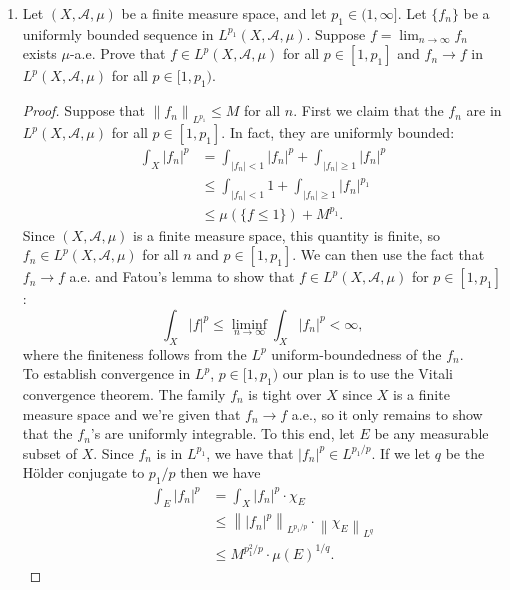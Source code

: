 \documentclass[11pt,letterpaper]{report}
\newcommand{\mcal}[1]{\mathcal{#1}}
\newcommand{\Lp}[2]{\left\|{#1}\right\|_{L^{#2}}}
\begin{document}
\begin{enumerate}
	\item Let $(X, \mcal{A}, \mu)$ be a finite measure space, and let $p_1\in (1, \infty]$. Let $\{f_n\}$ be a uniformly bounded sequence in $L^{p_1}(X, \mcal{A}, \mu)$. Suppose $f = \lim_{n\to \infty}f_n$ exists $\mu$-a.e. Prove that $f\in L^p(X, \mcal{A}, \mu)$ for all $p\in [1, p_1]$ and $f_n\to f$ in $L^p(X, \mcal{A}, \mu)$ for all $p\in [1, p_1)$.
	\begin{proof}
		Suppose that $\Lp{f_n}{p_1}\leq M$ for all $n$. First we claim that the $f_n$ are in $L^p(X, \mcal{A}, \mu)$ for all $p\in [1, p_1]$. In fact, they are uniformly bounded:
		\begin{equation}\label{s16_4_main}
		\begin{split}
			\int_X|f_n|^p &= \int_{|f_n|<1}|f_n|^p + \int_{|f_n|\geq 1}|f_n|^p\\
			&\leq \int_{|f_n|<1}1 + \int_{|f_n|\geq 1}|f_n|^{p_1}\\
			&\leq \mu(\{f\leq 1\}) + M^{p_1}.
		\end{split}
		\end{equation}
		Since $(X, \mcal{A}, \mu)$ is a finite measure space, this quantity is finite, so $f_n\in L^p(X, \mcal{A}, \mu)$ for all $n$ and $p\in [1, p_1]$. We can then use the fact that $f_n\to f$ a.e. and Fatou's lemma to show that $f\in L^p(X, \mcal{A}, \mu)$ for $p\in [1, p_1]$:
		\[
		\int_X|f|^p \leq \liminf_{n\to \infty}\int_X|f_n|^p<\infty,
		\]
		where the finiteness follows from the $L^p$ uniform-boundedness of the $f_n$.\\

		\noindent To establish convergence in $L^p$, $p\in [1, p_1)$ our plan is to use the Vitali convergence theorem. The family $f_n$ is tight over $X$ since $X$ is a finite measure space and we're given that $f_n\to f$ a.e., so it only remains to show that the $f_n$'s are uniformly integrable.
		To this end, let $E$ be any measurable subset of $X$. Since $f_n$ is in $L^{p_1}$, we have that $|f_n|^p\in L^{p_1/p}$. If we let $q$ be the H\"older conjugate to $p_1/p$ then we have
		\begin{align*}
			\int_E|f_n|^p &= \int_X |f_n|^p \cdot \chi_E\\
			&\leq \Lp{|f_n|^p}{p_1/p}\cdot \Lp{\chi_E}{q}\\
			&\leq M^{p_1^2/p}\cdot \mu(E)^{1/q}.
		\end{align*}


\end{proof}
\end{enumerate}
\end{document}

